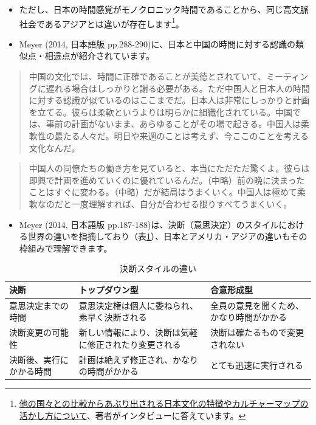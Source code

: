 \documentclass[
]{book}
\providecommand{\tightlist}{%
  \setlength{\itemsep}{0pt}\setlength{\parskip}{0pt}}
\begin{document}
\begin{itemize}
  \begin{itemize}
  \item
    ただし、日本の時間感覚がモノクロニック時間であることから、同じ高文脈社会であるアジアとは違いが存在します\footnote{\href{https://plus.alc.co.jp/2018/01/meyer/}{他の国々との比較からあぶり出される日本文化の特徴やカルチャーマップの活かし方について}、著者がインタビューに答えています。}。
  \item
    Meyer (2014, 日本語版 pp.288-290)に、日本と中国の時間に対する認識の類似点・相違点が紹介されています。
  \end{itemize}
\end{itemize}

\begin{quote}
中国の文化では、時間に正確であることが美徳とされていて、ミーティングに遅れる場合はしっかりと謝る必要がある。ただ中国人と日本人の時間に対する認識が似ているのはここまでだ。日本人は非常にしっかりと計画を立てる。彼らは柔軟というよりは明らかに組織化されている。中国では、事前の計画がないまま、あらゆることがその場で起きる。中国人は柔軟性の最たる人々だ。明日や来週のことは考えず、今ここのことを考える文化なんだ。
\end{quote}

\begin{quote}
中国人の同僚たちの働き方を見ていると、本当にただただ驚くよ。彼らは即興で計画を進めていくのに優れているんだ。（中略）前の晩に決まったことはすぐに変わる。（中略）だが結局はうまくいく。中国人は極めて柔軟なのだと一度理解すれば、自分が合わせる限りすべてうまくいく。
\end{quote}

\begin{itemize}
\tightlist
\item
  Meyer (2014, 日本語版 pp.187-188)は、決断（意思決定）のスタイルにおける世界の違いを指摘しており（表\ref{tab:decision}）、日本とアメリカ・アジアの違いもその枠組みで理解できます。
\end{itemize}

\begin{table}

\caption{\label{tab:decision}決断スタイルの違い}
\centering
\begin{tabular}[t]{l|l|l}
\hline
決断 & トップダウン型 & 合意形成型\\
\hline
意思決定までの時間 & 意思決定権は個人に委ねられ、素早く決断される & 全員の意見を聞くため、かなり時間がかかる\\
\hline
決断変更の可能性 & 新しい情報により、決断は気軽に修正されたり変更される & 決断は確たるもので変更されない\\
\hline
決断後、実行にかかる時間 & 計画は絶えず修正され、かなりの時間がかかる & とても迅速に実行される\\
\hline
\end{tabular}
\end{table}
\end{document}
